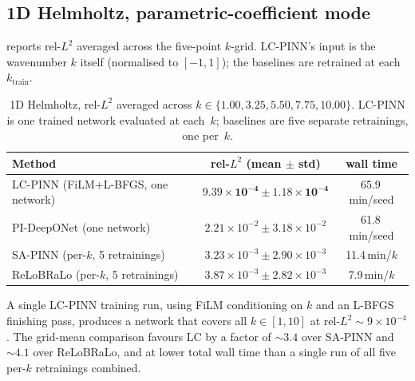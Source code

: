 \documentclass{article}
\theoremstyle{plain}
\theoremstyle{definition}
\theoremstyle{remark}
\begin{document}
\subsection{1D Helmholtz, parametric-coefficient mode}
\label{sec:results-helmholtz}

 reports rel-$L^2$ averaged across the
five-point $k$-grid. LC-PINN's input is the wavenumber $k$ itself
(normalised to $[-1,1]$); the baselines are retrained at each
$k_{\text{train}}$.

\begin{table}[h]
\centering
\caption{1D Helmholtz, rel-$L^2$ averaged across $k \in
\{1.00, 3.25, 5.50, 7.75, 10.00\}$. LC-PINN is one trained
network evaluated at each~$k$; baselines are five separate
retrainings, one per~$k$.}
\label{tab:helmholtz}
\begin{tabular}{lcc}
\toprule
Method & rel-$L^2$ (mean $\pm$ std) & wall time \\
\midrule
LC-PINN (FiLM+L-BFGS, one network) & $\mathbf{9.39 \times 10^{-4} \pm 1.18 \times 10^{-4}}$ & 65.9\,min/seed \\
PI-DeepONet (one network)          & $2.21 \times 10^{-2} \pm 3.18 \times 10^{-2}$ & 61.8\,min/seed \\
SA-PINN (per-$k$, 5 retrainings)   & $3.23 \times 10^{-3} \pm 2.90 \times 10^{-3}$ & 11.4\,min/$k$ \\
ReLoBRaLo (per-$k$, 5 retrainings) & $3.87 \times 10^{-3} \pm 2.82 \times 10^{-3}$ & 7.9\,min/$k$ \\
\bottomrule
\end{tabular}
\end{table}

A single LC-PINN training run, using FiLM conditioning
\citep{perez2018film} on $k$ and an L-BFGS finishing pass, produces
a network that
covers all $k \in [1, 10]$ at rel-$L^2 \!\sim\! 9 \times 10^{-4}$.
The grid-mean comparison favours LC by a factor of $\sim\!3.4$ over
SA-PINN and $\sim\!4.1$ over ReLoBRaLo, and at lower total wall
time than a single run of all five per-$k$ retrainings combined.
\end{document}
